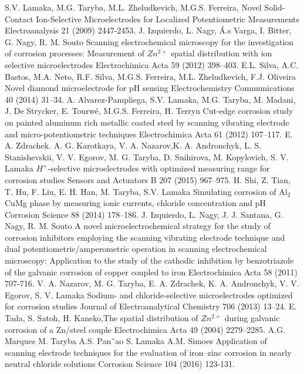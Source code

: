 \documentclass[3p]{elsarticle}
\begin{document}
\begin{thebibliography}{5}

S.V. Lamaka, M.G. Taryba, M.L. Zheludkevich, M.G.S. Ferreira, Novel Solid-Contact Ion-Selective Microelectrodes for Localized Potentiometric Measurements Electroanalysis 21 (2009) 2447-2453.
J. Izquierdo, L. Nagy, Á.s Varga, I. Bitter, G. Nagy, R. M. Souto Scanning electrochemical microscopy for the investigation of corrosion processes: Measurement of  $Zn^{2+}$ spatial distribution with ion selective microelectrodes Electrochimica Acta 59 (2012) 398–403. 
E.L. Silva, A.C. Bastos, M.A. Neto, R.F. Silva, M.G.S. Ferreira, M.L. Zheludkevich, F.J. Oliveira Novel diamond microelectrode for pH sensing Electrochemistry Communications 40 (2014) 31–34.
A. Alvarez-Pampliega, S.V. Lamaka, M.G. Taryba, M. Madani, J. De Strycker, E. Tourwé, M.G.S. Ferreira, H. Terryn Cut-edge corrosion study on painted aluminum rich metallic coated steel by scanning vibrating electrode and micro-potentiometric techniques Electrochimica Acta 61 (2012) 107–117.	
E. A. Zdrachek. A. G. Karotkaya, V. A. Nazarov,K. A. Andronchyk, L. S. Stanishevskii, V. V. Egorov, M. G. Taryba, D. Snihirova, M. Kopylovich, S. V. Lamaka $H^{+}$-selective microelectrodes with optimized measuring range for corrosion studies  Sensors and Actuators B 207 (2015) 967–975.
H. Shi, Z. Tian, T. Hu, F. Liu, E. H. Han, M. Taryba, S.V. Lamaka Simulating corrosion of Al$_{2}$CuMg phase by measuring ionic currents, chloride concentration and pH Corrosion Science 88 (2014) 178–186.
J. Izquierdo, L. Nagy, J. J. Santana, G. Nagy, R. M. Souto A novel microelectrochemical strategy for the study of corrosion inhibitors employing the scanning vibrating electrode technique and dual potentiometric/amperometric operation in scanning electrochemical microscopy: Application to the study of the cathodic inhibition by benzotriazole of the galvanic corrosion of copper coupled to iron Electrochimica Acta 58 (2011) 707-716.
V. A. Nazarov, M. G. Taryba, E. A. Zdrachek, K. A. Andronchyk, V. V. Egorov, S. V. Lamaka Sodium- and chloride-selective microelectrodes optimized for corrosion studies Journal of Electroanalytical Chemistry 706 (2013) 13–24.
E. Tada, S. Satoh, H. Kaneko,The spatial distribution of $Zn^{2+}$ during galvanic corrosion of a Zn/steel couple Electrochimica Acta 49 (2004) 2279–2285.
A.G. Marques M. Taryba A.S. Pan˜ao S. Lamaka A.M. Simoes Application of scanning electrode techniques for the evaluation of iron–zinc corrosion in nearly neutral chloride solutions Corrosion Science 104 (2016) 123-131.

\end{thebibliography}
\end{document}

